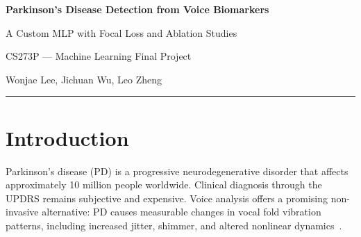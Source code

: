 \documentclass[11pt,a4paper]{article}
\begin{document}
\begin{center}
    {\LARGE\bfseries Parkinson's Disease Detection from Voice Biomarkers}

    \vspace{0.5em}

    {\large A Custom MLP with Focal Loss and Ablation Studies}

    \vspace{1em}

    {\large CS273P --- Machine Learning Final Project}

    \vspace{1.5em}
    {\large Wonjae Lee, Jichuan Wu, Leo Zheng}
\end{center}

\vspace{0.5em}\hrule\vspace{1em}

\begin{abstract}
We implement a custom multi-layer perceptron (MLP) in PyTorch for detecting
Parkinson's disease from 22 voice biomarker features. We employ Focal Loss to
handle the 75:25 class imbalance and enforce subject-level cross-validation to
prevent data leakage. Systematic ablation studies over loss functions, architecture 
depth/width, and dropout rates reveal that:
(1) Focal Loss and standard BCE perform comparably on F1, but differ on MCC;
(2) shallower architectures match or outperform deeper ones on this small
dataset; and (3) light dropout ($p\approx0.1$) provides the best regularization.
Our honest subject-level evaluation yields F1$=$0.893 and MCC$=$0.448,
substantially below the $>$90\% accuracy commonly reported without proper
subject splitting.
\end{abstract}


\section{Introduction}

Parkinson's disease (PD) is a progressive neurodegenerative disorder that
affects approximately 10 million people worldwide. Clinical diagnosis through
the UPDRS remains subjective and expensive. Voice analysis offers a promising
non-invasive alternative: PD causes measurable changes in vocal fold vibration
patterns, including increased jitter, shimmer, and altered nonlinear
dynamics~\cite{little2007exploiting}.
\end{document}
